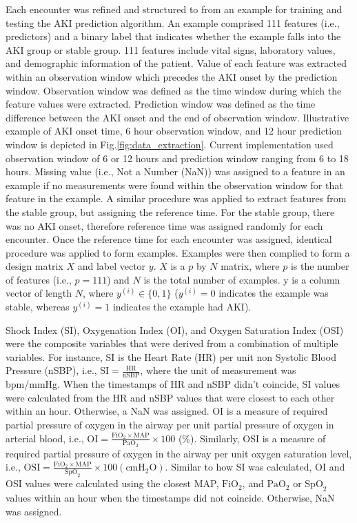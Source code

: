\documentclass[
   technote
]{phildoc}
\newcommand{\ie}{i.e.,}
\newcommand{\fig}{Fig.}
\begin{document}
Each encounter was refined and structured to from an example for training and testing the AKI prediction algorithm. An example comprised 111 features (\ie{} predictors) and a binary label that indicates whether the example falls into the AKI group or stable group. 111 features include vital signs, laboratory values, and demographic information of the patient. Value of each feature was extracted within an observation window which precedes the AKI onset by the prediction window. Observation window was defined as the time window during which the feature values were extracted. Prediction window was defined as the time difference between the AKI onset and the end of observation window. Illustrative example of AKI onset time, 6 hour observation window, and 12 hour prediction window is depicted in \fig{}\ref{fig:data_extraction}. Current implementation used observation window of 6 or 12 hours and prediction window ranging from 6 to 18 hours. Missing value (\ie{} Not a Number (NaN)) was assigned to a feature in an example if no measurements were found within the observation window for that feature in the example. A similar procedure was applied to extract features from the stable group, but assigning the reference time. For the stable group, there was no AKI onset, therefore reference time was assigned randomly for each encounter. Once the reference time for each encounter was assigned, identical procedure was applied to form examples. Examples were then complied to form a design matrix $X$ and label vector $y$.  $X$ is a $p$ by $N$ matrix, where $p$ is the number of features (\ie{} $p=111$) and $N$ is the total number of examples. y is a column vector of length $N$, where $y^{(i)} \in \lbrace{ 0, 1\rbrace}$ ($y^{(i)}=0$ indicates the example was stable, whereas $y^{(i)}=1$ indicates the example had AKI).

Shock Index (SI), Oxygenation Index (OI), and Oxygen Saturation Index (OSI) were the composite variables that were derived from a combination of multiple variables. For instance, SI is the Heart Rate (HR) per unit non Systolic Blood Pressure (nSBP), \ie{} $\displaystyle\text{SI} = \frac{\text{HR}}{\text{nSBP}}$, where the unit of measurement was bpm/mmHg. When the timestamps of HR and nSBP didn't coincide, SI values were calculated from the HR and nSBP values that were closest to each other within an hour. Otherwise, a NaN was assigned. OI is a measure of required partial pressure of oxygen in the airway per unit partial pressure of oxygen in arterial blood, \ie{} $\displaystyle \text{OI} = \frac{\text{FiO}_2 \times\text{MAP}}{\text{PaO}_2}\times 100$ (\%). Similarly, OSI is a measure of required partial pressure of oxygen in the airway per unit oxygen saturation level, \ie{} $\displaystyle \text{OSI} = \frac{\text{FiO}_2 \times\text{MAP}}{\text{SpO}_2}\times 100 \left(\text{cmH}_2\text{O}\right)$. Similar to how SI was calculated, OI and OSI values were calculated using the closest MAP, $\text{FiO}_2$, and $\text{PaO}_2$ or $\text{SpO}_2$ values within an hour when the timestamps did not coincide. Otherwise, NaN was assigned.
\end{document}
